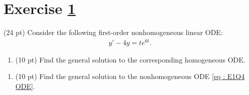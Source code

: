 %
%
%
%


\section{Exercise \ref{sec : Math211 Summer2019 Exam1 Q4}}
\label{sec : Math211 Summer2019 Exam1 Q4}

(24 pt) Consider the following first-order nonhomogeneous linear ODE:
\begin{align}
y' - 4 y
=
t e^{6 t}.%
\label{eq : E1Q4 ODE}
\end{align}

\begin{enumerate}[label=(\alph*)]
\item\label{itm : E1Q4a} (10 pt) Find the general solution to the corresponding homogeneous ODE.
\end{enumerate}


\begin{enumerate}[resume,label=(\alph*)]
\item\label{itm : E1Q4b} (10 pt) Find the general solution to the nonhomogeneous ODE \eqref{eq : E1Q4 ODE}.
\end{enumerate}


